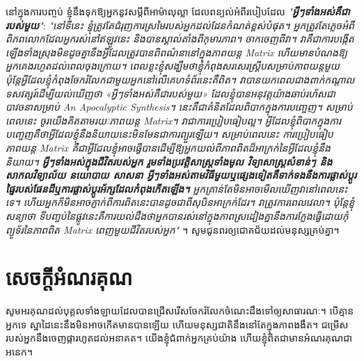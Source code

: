 \documentclass[10pt,twocolumn,letterpaper]{article}
\begin{document}
នៅក្នុងការបញ្ចប់ ខ្ញុំនឹងទុកឱ្យអ្នកនូវសម្តីពីអាម៉ាលុល្លា ដែលពន្យល់អំពីរបៀបដែល \textit{"\textbf{អ្វីៗទាំងអស់គឺជារបស់មួយ}"}: \textit{"នៅទីនេះ ខ្ញុំត្រូវតែជំរុញការស្រមៃរបស់អ្នកដល់ដែនកំណត់ខ្ពស់បំផុត។ អ្នកត្រូវតែភ្លេចអំពីពិភពលោកដែលអ្នករស់នៅឥឡូវនេះ និងបានស្គាល់តាំងពីកុមារភាព។ ចាកចេញពីវា។ វាគឺជាការបង្កើតឡើងទាំងស្រុងមិនដូចគ្នានឹងអ្វីដែលត្រូវបានពិពណ៌នានៅក្នុងភាពយន្ត Matrix ហើយមានបំណងឱ្យអ្នកគេងរហូតដល់ពេលចុងក្រោយ។ ពេលខ្លះខ្ញុំសង្ឃឹមថាខ្ញុំកំពុងសរសេរស្គ្រីបសម្រាប់ភាពយន្តមួយ ប៉ុន្តែអ្វីដែលខ្ញុំកំពុងចែករំលែកជាមួយអ្នកនៅលើគេហទំព័រនេះគឺពិត។ វាបានយកពេលជាងពាក់កណ្តាលទសវត្សរ៍ដើម្បីយល់ឃើញថា «អ្វីៗទាំងអស់គឺជារបស់មួយ» ដែលខ្ញុំបានអនុវត្តយ៉ាងឆាប់រហ័សជាបាវចនាសម្រាប់ An Apocalyptic Synthesis។ នេះគឺជាគំនិតដែលពិបាកក្នុងការបញ្ចេញ។ សម្រាប់ពេលនេះ ចូរយើងគិតតាមរយៈភាពយន្ត Matrix។ វាជាការប្រៀបធៀបល្អ។ អ្វីដែលខ្ញុំពិបាកក្នុងការបញ្ចេញគឺថាអ្វីដែលខ្ញុំនឹងនិយាយនេះមិនមែនជាការព្យួរឡើយ។ សម្រាប់ពេលនេះ ការប្រៀបធៀបភាពយន្ត Matrix គឺជាអ្វីដែលខ្ញុំអាចធ្វើបានដើម្បីឱ្យអ្នកយល់ពីភាពពិតដ៏អាក្រក់នៃអ្វីដែលខ្ញុំនឹងនិយាយ។ \textbf{អ្វីៗទាំងអស់ក្នុងជីវិតរបស់អ្នក រួមទាំងប្រវត្តិសាស្ត្រទាំងមូល វិទ្យាសាស្ត្រសំខាន់ៗ និងសាកលវិទ្យាល័យ នយោបាយ សាសនា អ្វីៗទាំងអស់តាមវិធីមួយឬផ្សេងទៀតគឺទាក់ទងនឹងការផ្លាស់ប្តូរផ្ទៃរបស់ផែនដីឬការផ្លាស់ប្តូរអ័ក្សដែលកំពុងកើតឡើង។} អ្នកគ្រាន់តែមិនអាចមើលឃើញវានៅពេលនេះទេ។ ហើយអ្នកក៏មិនអាចភ្ញាក់ពីការពិតនេះបានដូចជាពីសុបិនអាក្រក់ដែរ។ វាត្រូវការពេលវេលា។ ប៉ុន្តែខ្ញុំសន្យាថា ទីបញ្ចប់នៃផ្លូវនេះគឺការយល់ដឹងថាអ្នកបានរស់នៅក្នុងភាពស្រដៀងគ្នានឹងការក្លែងធ្វើដោយកុំព្យូទ័រនៃភាពពិត Matrix ពេញមួយជីវិតរបស់អ្នក"} \cite{33,34}។
សូមជូនពរឲ្យជោគជ័យដល់មនុស្សគ្រប់គ្នា។

\section{សេចក្តីអំណរគុណ}

សូមអរគុណដល់បុគ្គលទាំងឡាយដែលបានជ្រើសរើសចែករំលែកចំណេះដឹងទៅឲ្យសាធារណៈ។ បើគ្មានអ្នកទេ ស្នាដៃនេះនឹងមិនអាចកើតមានបានឡើយ ហើយមនុស្សជាតិនឹងនៅតែក្នុងភាពងងឹត។ ជម្រើសរបស់អ្នកនឹងចេញផ្ការហូតដល់អនាគត។ យើងខ្ញុំជំពាក់អ្នកគ្រប់យ៉ាង ហើយខ្ញុំពិតជាមានអំណរគុណជាអនេក។
\clearpage
\twocolumn

{\small
\renewcommand{\refname}{ឯកសារយោង}


}
\end{document}
